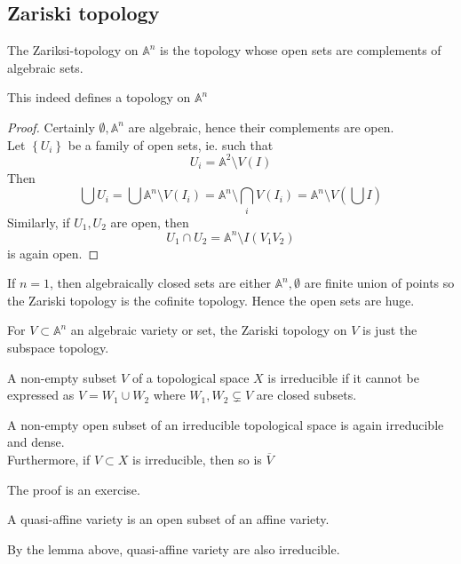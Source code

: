 \documentclass[../main.tex]{subfiles}
\begin{document}
\subsection{Zariski topology}
\begin{defn}
The Zariksi-topology on $ \mathbb{A}^{n}$ is the topology whose open sets are complements of algebraic sets.	
\end{defn}
\begin{lemma}
This indeed defines a topology on $ \mathbb{A}^{n}$ 
\end{lemma}
\begin{proof}
Certainly $\emptyset, \mathbb{A}^{n}$ are algebraic, hence their complements are open.\\
Let $ \left\{ U_i \right\} $ be a family of open sets, ie. such that
\[ 
U_i = \mathbb{A}^{2} \setminus V( I) 
\]
Then
\[ 
\bigcup U_i = \bigcup \mathbb{A}^{n}\setminus V( I_i) = \mathbb{A}^{n}\setminus \bigcap_i V( I_i) = \mathbb{A}^{n}\setminus V( \bigcup I) 
\]
Similarly, if $U_1,U_2$ are open, then
\[ 
U_1\cap U_2 = \mathbb{A}^{n} \setminus I( V_1V_2) 	
\]
is again open.

\end{proof}
\begin{exemple}
If $n=1$, then algebraically closed sets are either $ \mathbb{A}^{n}, \emptyset$ are finite union of points so the Zariski topology is the cofinite topology. Hence the open sets are huge.	
\end{exemple}
\begin{defn}
	For $V \subset \mathbb{A}^{n}$ an algebraic variety or set, the Zariski topology on $V$ is just the subspace topology.
\end{defn}
\begin{defn}
	A non-empty subset $V$ of a topological space $X$ is irreducible if it cannot be expressed as $V= W_1\cup W_2$ where $W_1,W_2 \subsetneq V$ are closed subsets.	
\end{defn}
\begin{lemma}
A non-empty open subset of an irreducible topological space is again irreducible and dense.\\
Furthermore, if $ V \subset X$ is irreducible, then so is $ \overline{V}$ 
\end{lemma}
The proof is an exercise.
\begin{defn}
	A quasi-affine variety is an open subset of an affine variety.	
\end{defn}
\begin{rmq}
By the lemma above, quasi-affine variety are also irreducible.
\end{rmq}
\end{document}
